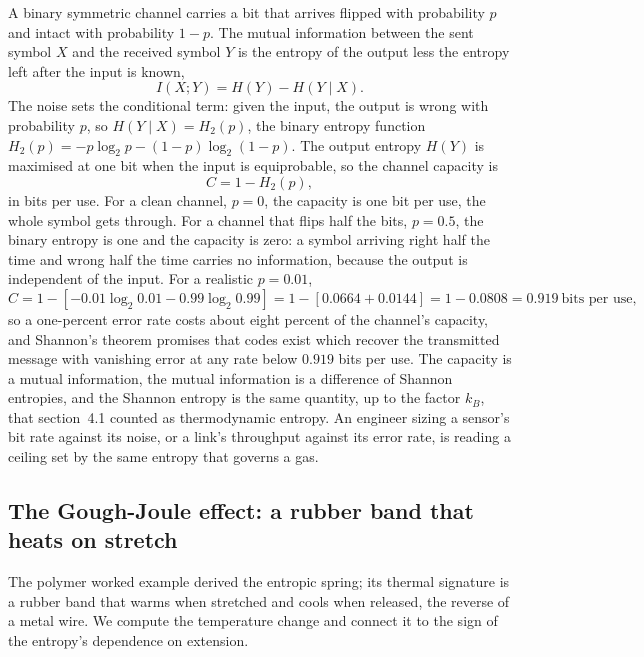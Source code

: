 A binary symmetric channel carries a bit that arrives flipped with probability
$p$ and intact with probability $1 - p$. The mutual information between the sent
symbol $X$ and the received symbol $Y$ is the entropy of the output less the
entropy left after the input is known,
\[
I(X;Y) = H(Y) - H(Y \mid X).
\]
The noise sets the conditional term: given the input, the output is wrong with
probability $p$, so $H(Y\mid X) = H_2(p)$, the binary entropy function $H_2(p) =
-p\log_2 p - (1-p)\log_2(1-p)$. The output entropy $H(Y)$ is maximised at one
bit when the input is equiprobable, so the channel capacity is
\[
C = 1 - H_2(p),
\]
in bits per use. For a clean channel, $p = 0$, the capacity is one bit per use,
the whole symbol gets through. For a channel that flips half the bits, $p = 0.5$,
the binary entropy is one and the capacity is zero: a symbol arriving right half
the time and wrong half the time carries no information, because the output is
independent of the input. For a realistic $p = 0.01$,
\[
C = 1 - [-0.01\log_2 0.01 - 0.99\log_2 0.99]
= 1 - [0.0664 + 0.0144]
= 1 - 0.0808 = 0.919\ \text{bits per use},
\]
so a one-percent error rate costs about eight percent of the channel's
capacity, and Shannon's theorem promises that codes exist which recover the
transmitted message with vanishing error at any rate below $0.919$ bits per use.
The capacity is a mutual information, the mutual information is a difference of
Shannon entropies, and the Shannon entropy is the same quantity, up to the
factor $k_B$, that section~4.1 counted as thermodynamic entropy. An engineer
sizing a sensor's bit rate against its noise, or a link's throughput against its
error rate, is reading a ceiling set by the same entropy that governs a gas.

\subsection{The Gough-Joule effect: a rubber band that heats on stretch}

The polymer worked example derived the entropic spring; its thermal signature is
a rubber band that warms when stretched and cools when released, the reverse of
a metal wire. We compute the temperature change and connect it to the sign of
the entropy's dependence on extension.

